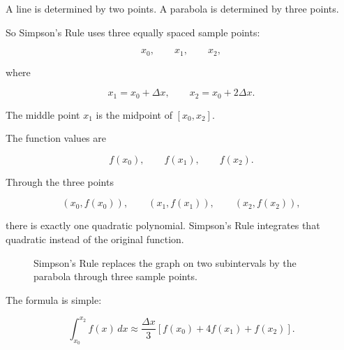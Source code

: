 A line is determined by two points.  A parabola is determined by three points.

So Simpson's Rule uses three equally spaced sample points:

\[
x_0,\qquad x_1,\qquad x_2,
\]

where

\[
x_1=x_0+\Delta x,
\qquad
x_2=x_0+2\Delta x.
\]

The middle point \(x_1\) is the midpoint of \([x_0,x_2]\).

The function values are

\[
f(x_0),\qquad f(x_1),\qquad f(x_2).
\]

Through the three points

\[
(x_0,f(x_0)),\qquad (x_1,f(x_1)),\qquad (x_2,f(x_2)),
\]

there is exactly one quadratic polynomial.  Simpson's Rule integrates that quadratic
instead of the original function.

\begin{figure}[h]
\centering
{}
\caption{Simpson's Rule replaces the graph on two subintervals by the parabola through three sample points.}
\label{fig:simpson-quadratic-through-three-points}
\end{figure}

The formula is simple:

\[
\boxed{
\int_{x_0}^{x_2} f(x)\,dx
\approx
\frac{\Delta x}{3}
\left[
f(x_0)+4f(x_1)+f(x_2)
\right].
}
\]

